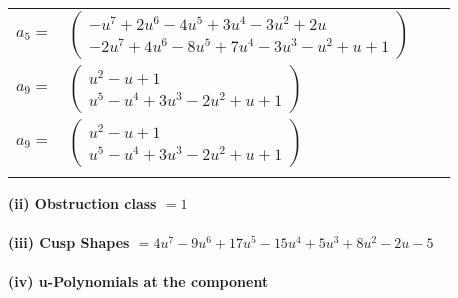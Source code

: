 \documentclass[1p]{elsarticle_modified}
\theoremstyle{definition}
\begin{document}
\begin{tabular}{m{7pt} m{180pt} m{7pt} m{180pt} }
\flushright $a_{5}=$&$\begin{pmatrix}- u^7+2 u^6-4 u^5+3 u^4-3 u^2+2 u\\-2 u^7+4 u^6-8 u^5+7 u^4-3 u^3- u^2+u+1\end{pmatrix}$ \\
\flushright $a_{9}=$&$\begin{pmatrix}u^2- u+1\\u^5- u^4+3 u^3-2 u^2+u+1\end{pmatrix}$\\ \flushright $a_{9}=$&$\begin{pmatrix}u^2- u+1\\u^5- u^4+3 u^3-2 u^2+u+1\end{pmatrix}$\\&\end{tabular}
\flushleft \textbf{(ii) Obstruction class $= 1$}\\~\\
\flushleft \textbf{(iii) Cusp Shapes $= 4 u^7-9 u^6+17 u^5-15 u^4+5 u^3+8 u^2-2 u-5$}\\~\\
\newpage\renewcommand{\arraystretch}{1}
\flushleft \textbf{(iv) u-Polynomials at the component}\newline \\
\end{document}
